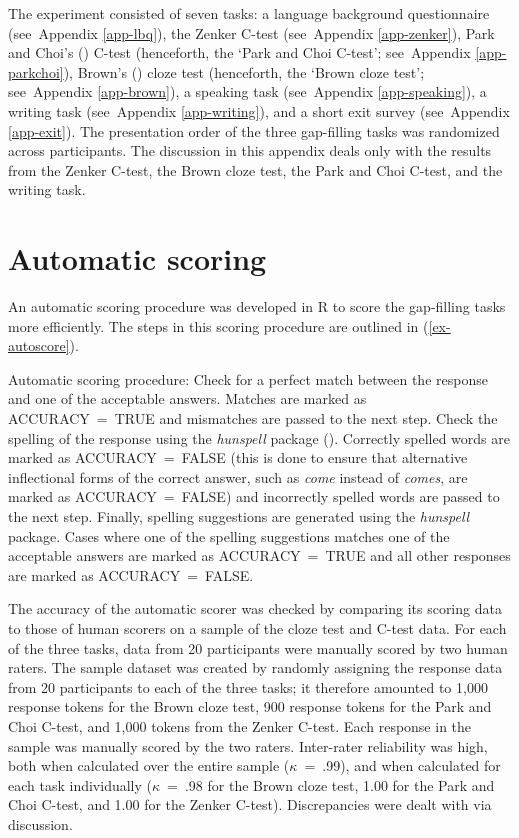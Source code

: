 The experiment consisted of seven tasks: a language background questionnaire (see~Appendix \ref{app-lbq}), the Zenker C-test (see~Appendix \ref{app-zenker}), Park and Choi's (\citeyear{park.choi2018}) C-test (henceforth, the `Park and Choi C-test'; see~Appendix \ref{app-parkchoi}), Brown's (\citeyear{brown1980}) cloze test (henceforth, the `Brown cloze test'; see~Appendix \ref{app-brown}), a speaking task (see~Appendix \ref{app-speaking}), a writing task (see~Appendix \ref{app-writing}), and a short exit survey (see~Appendix \ref{app-exit}). The presentation order of the three gap-filling tasks was randomized across participants. The discussion in this appendix deals only with the results from the Zenker C-test, the Brown cloze test, the Park and Choi C-test, and the writing task.

\section{Automatic scoring}\label{app-validation-scoring}

An automatic scoring procedure was developed in R to score the gap-filling tasks more efficiently. The steps in this scoring procedure are outlined in (\ref{ex-autoscore}).

\pex Automatic scoring procedure: \label{ex-autoscore}
\a Check for a perfect match between the response and one of the acceptable answers. Matches are marked as ACCURACY~=~TRUE and mismatches are passed to the next step.
\a Check the spelling of the response using the \textit{hunspell} package (\cite{ooms2022}). Correctly spelled words are marked as ACCURACY~=~FALSE (this is done to ensure that alternative inflectional forms of the correct answer, such as \textit{come} instead of \textit{comes}, are marked as ACCURACY~=~FALSE) and incorrectly spelled words are passed to the next step.
\a Finally, spelling suggestions are generated using the \textit{hunspell} package. Cases where one of the spelling suggestions matches one of the acceptable answers are marked as ACCURACY~=~TRUE and all other responses are marked as ACCURACY~=~FALSE.
\xe 

The accuracy of the automatic scorer was checked by comparing its scoring data to those of human scorers on a sample of the cloze test and C-test data. For each of the three tasks, data from 20 participants were manually scored by two human raters. The sample dataset was created by randomly assigning the response data from 20 participants to each of the three tasks; it therefore amounted to 1,000 response tokens for the Brown cloze test, 900 response tokens for the Park and Choi C-test, and 1,000 tokens from the Zenker C-test. Each response in the sample was manually scored by the two raters. Inter-rater reliability was high, both when calculated over the entire sample ($\kappa$~=~.99), and when calculated for each task individually ($\kappa$~=~.98 for the Brown cloze test, 1.00 for the Park and Choi C-test, and 1.00 for the Zenker C-test). Discrepancies were dealt with via discussion.

